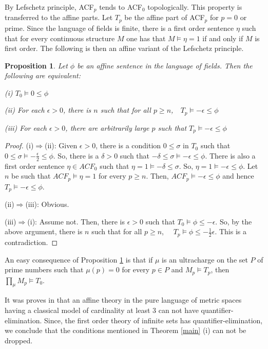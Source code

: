 \documentclass[12pt]{article}
\newtheorem{proposition}[theorem]{Proposition}
\begin{document}
By Lefschetz principle, ACF$_p$ tends to ACF$_0$ topologically. This property is
transferred to the affine parts. Let $T_p$ be the affine part of ACF$_p$ for $p=0$ or prime.
Since the language of fields is finite, there is a first order sentence $\eta$ such that for every
continuous structure $M$ one has that $M\vDash\eta=1$ if and only if $M$ is first order.
The following is then an affine variant of the Lefschetz principle.

\begin{proposition} \label{limit theory}
Let $\phi$ be an affine sentence in the language of fields. Then the following are equivalent:

(i) $T_0\vDash0\leqslant\phi$

(ii) For each $\epsilon>0$, there is $n$ such that for all $p\geqslant n$,\ \ $T_p\vDash-\epsilon\leqslant\phi$

(iii) For each $\epsilon>0$, there are arbitrarily large $p$ such that $T_p\vDash-\epsilon\leqslant\phi$
\end{proposition}
\begin{proof}
(i)$\Rightarrow$(ii): Given $\epsilon>0$, there is a condition $0\leqslant\sigma$ in $T_0$ such that
$0\leqslant\sigma\vDash-\frac{\epsilon}{2}\leqslant\phi$. So, there is a $\delta>0$ such that
$-\delta\leqslant\sigma\vDash-\epsilon\leqslant\phi$.
There is also a first order sentence $\eta\in ACF_0$ such that $\eta=1\vDash-\delta\leqslant\sigma$.
So, $\eta=1\vDash-\epsilon\leqslant\phi$. Let $n$ be such that $ACF_p\vDash\eta=1$ for every $p\geqslant n$.
Then, $ACF_p\vDash-\epsilon\leqslant\phi$ and hence $T_p\vDash-\epsilon\leqslant\phi$.

(ii)$\Rightarrow$(iii): Obvious.

(iii)$\Rightarrow$(i): Assume not. Then, there is $\epsilon>0$ such that $T_0\vDash\phi\leqslant-\epsilon$.
So, by the above argument, there is $n$ such that for all $p\geqslant n$, \ \
$T_p\vDash\phi\leqslant-\frac{1}{2}\epsilon$. This is a contradiction.
\end{proof}

An easy consequence of Proposition \ref{limit theory} is that if $\mu$ is an ultracharge
on the set $P$ of prime numbers such that $\mu(p)=0$ for every $p\in P$ and $M_p\vDash T_p$,
then $\prod_\mu M_p\vDash T_0$.

It was proves in \cite{Bagheri-Lip} that an affine theory in the pure language of metric spaces
having a classical model of cardinality at least $3$ can not have quantifier-elimination.
Since, the first order theory of infinite sets has quantifier-elimination,
we conclude that the conditions mentioned in Theorem \ref{main} (i) can not be dropped.
\end{document}
